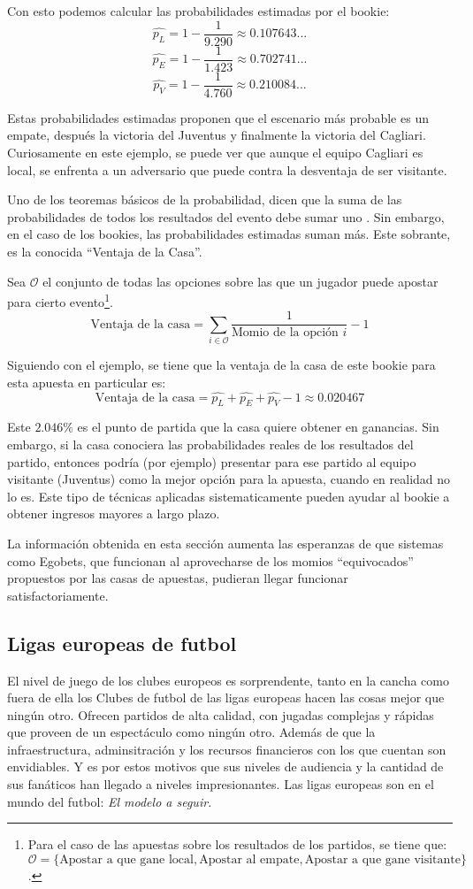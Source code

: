 Con esto podemos calcular las probabilidades estimadas por el bookie:
\[\hat{p_L} = 1 - \frac{1}{9.290} \approx 0.107643...\]
\[\hat{p_E} = 1 - \frac{1}{1.423} \approx 0.702741...\]
\[\hat{p_V} = 1 - \frac{1}{4.760} \approx 0.210084...\]

Estas probabilidades estimadas proponen que el escenario más probable es un empate, después la victoria del Juventus y finalmente la victoria del Cagliari. Curiosamente en este ejemplo, se puede ver que aunque el equipo Cagliari es local, se enfrenta a un adversario que puede contra la desventaja de ser visitante.

Uno de los teoremas básicos de la probabilidad, dicen que la suma de las probabilidades de todos los resultados del evento debe sumar uno \cite{ross2006first}. Sin embargo, en el caso de los bookies, las probabilidades estimadas suman más. Este sobrante, es la conocida ``Ventaja de la Casa''.

Sea $\mathcal{O}$ el conjunto de todas las opciones sobre las que un jugador puede apostar para cierto evento\footnote{Para el caso de las apuestas sobre los resultados de los partidos, se tiene que: $\mathcal{O} = \{\text{Apostar a que gane local}, \text{Apostar al empate}, \text{Apostar a que gane visitante}\}$.}.
\[\text{Ventaja de la casa} =  \sum_{i \in \mathcal{O}}{\frac{1}{\text{Momio de la opción } i}} - 1\] 

Siguiendo con el ejemplo, se tiene que la ventaja de la casa de este bookie para esta apuesta en particular es:
\[\text{Ventaja de la casa} = \hat{p_L} + \hat{p_E} + \hat{p_V} - 1 \approx 0.020467\]

Este $2.046\%$ es el punto de partida que la casa quiere obtener en ganancias. Sin embargo, si la casa conociera las probabilidades reales de los resultados del partido, entonces podría (por ejemplo) presentar para ese partido al equipo visitante (Juventus) como la mejor opción para la apuesta, cuando en realidad no lo es. Este tipo de técnicas aplicadas sistematicamente pueden ayudar al bookie a obtener ingresos mayores a largo plazo.

La información obtenida en esta sección aumenta las esperanzas de que sistemas como Egobets, que funcionan al aprovecharse de los momios ``equivocados'' propuestos por las casas de apuestas, pudieran llegar funcionar satisfactoriamente.


\subsection{Ligas europeas de futbol}
El nivel de juego de los clubes europeos es sorprendente, tanto en la cancha como fuera de ella los Clubes de futbol de las ligas europeas hacen las cosas mejor que ningún otro. Ofrecen partidos de alta calidad, con jugadas complejas y rápidas que proveen de un espectáculo como ningún otro. Además de que la infraestructura, adminsitración y los recursos financieros con los que cuentan son envidiables. Y es por estos motivos que sus niveles de audiencia y la cantidad de sus fanáticos han llegado a niveles impresionantes. Las ligas europeas son en el mundo del futbol: \emph{El modelo a seguir.}



